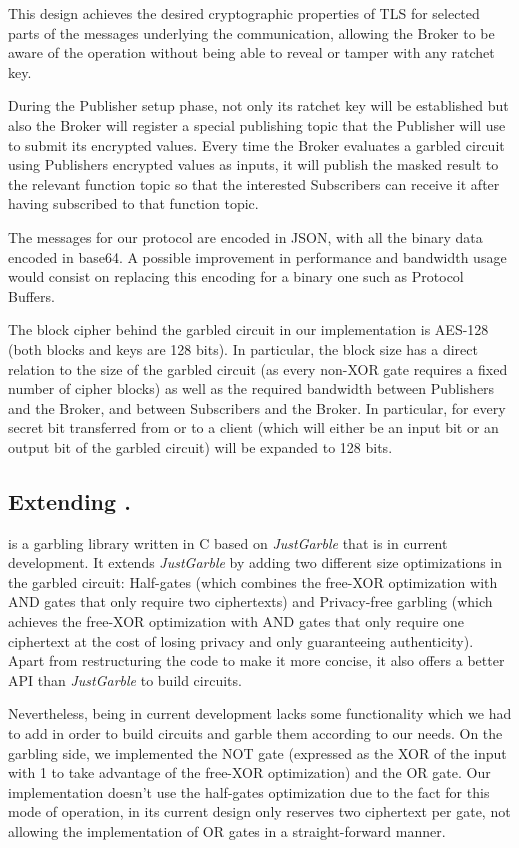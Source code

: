 This design achieves the desired cryptographic properties of TLS for selected
parts of the messages underlying the \MQTT{} communication, allowing the Broker
to be aware of the operation without being able to reveal or tamper with any
ratchet key.

During the Publisher setup phase, not only its ratchet key will be established
but also the Broker will register a special publishing topic that the Publisher
will use to submit its encrypted values.  Every time the Broker evaluates a
garbled circuit using Publishers encrypted values as inputs, it will publish
the masked result to the relevant function topic so that the interested
Subscribers can receive it after having subscribed to that function topic.

The \MQTT{} messages for our protocol are encoded in JSON, with all the binary
data encoded in base64.  A possible improvement in performance and bandwidth
usage would consist on replacing this encoding for a binary one such as
Protocol Buffers.

The block cipher behind the garbled circuit in our implementation is AES-128
(both blocks and keys are 128 bits).  In particular, the block size has a
direct relation to the size of the garbled circuit (as every non-XOR gate
requires a fixed number of cipher blocks) as well as the required bandwidth
between Publishers and the Broker, and between Subscribers and the Broker.  In
particular, for every secret bit transferred from or to a client (which will
either be an input bit or an output bit of the garbled circuit) will be
expanded to 128 bits.

\subsection{Extending \libgarble.}

\libgarble{} is a garbling library written in C based on \emph{JustGarble} that
is in current development.  It extends \emph{JustGarble} by adding two
different size optimizations in the garbled circuit: Half-gates (which combines
the free-XOR optimization with AND gates that only require two ciphertexts) and
Privacy-free garbling (which achieves the free-XOR optimization with AND gates
that only require one ciphertext at the cost of losing privacy and only
guaranteeing authenticity).  Apart from restructuring the code to make it more
concise, it also offers a better API than \emph{JustGarble} to build circuits.

Nevertheless, \libgarble{} being in current development lacks some
functionality which we had to add in order to build circuits and garble them
according to our needs.  On the garbling side, we implemented the NOT gate
(expressed as the XOR of the input with 1 to take advantage of the free-XOR
optimization) and the OR gate.  Our implementation doesn't use the half-gates
optimization due to the fact for this mode of operation, \libgarble{} in its
current design only reserves two ciphertext per gate, not allowing the
implementation of OR gates in a straight-forward manner.

